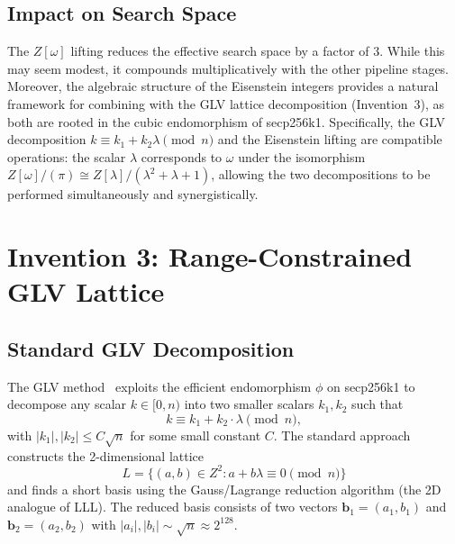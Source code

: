 \documentclass[11pt,a4paper]{article}
\theoremstyle{definition}
\begin{document}
\subsection{Impact on Search Space}

The $Z[\omega]$ lifting reduces the effective search space by a factor of $3$. While this may seem modest, it compounds multiplicatively with the other pipeline stages. Moreover, the algebraic structure of the Eisenstein integers provides a natural framework for combining with the GLV lattice decomposition (Invention~3), as both are rooted in the cubic endomorphism of secp256k1. Specifically, the GLV decomposition $k \equiv k_1 + k_2 \lambda \pmod{n}$ and the Eisenstein lifting are compatible operations: the scalar $\lambda$ corresponds to $\omega$ under the isomorphism $Z[\omega]/(\pi) \cong Z[\lambda]/(\lambda^2 + \lambda + 1)$, allowing the two decompositions to be performed simultaneously and synergistically.

\section{Invention 3: Range-Constrained GLV Lattice}

\subsection{Standard GLV Decomposition}

The GLV method~\cite{GLV2001} exploits the efficient endomorphism $\phi$ on secp256k1 to decompose any scalar $k \in [0, n)$ into two smaller scalars $k_1, k_2$ such that
\begin{equation}
  k \equiv k_1 + k_2 \cdot \lambda \pmod{n},
  \label{eq:glv-decomp}
\end{equation}
with $|k_1|, |k_2| \leq C \sqrt{n}$ for some small constant $C$. The standard approach constructs the 2-dimensional lattice
\begin{equation}
  L = \{(a, b) \in Z^2 : a + b\lambda \equiv 0 \pmod{n}\}
  \label{eq:glv-lattice}
\end{equation}
and finds a short basis using the Gauss/Lagrange reduction algorithm (the 2D analogue of LLL). The reduced basis consists of two vectors $\mathbf{b}_1 = (a_1, b_1)$ and $\mathbf{b}_2 = (a_2, b_2)$ with $|a_i|, |b_i| \sim \sqrt{n} \approx 2^{128}$.
\end{document}
